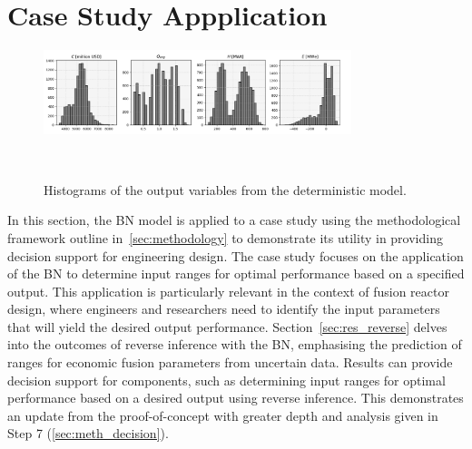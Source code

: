\documentclass[journal]{IEEEtran}
\begin{document}
\section{Case Study Appplication}\label{sec:res_decision} 

\begin{figure}[t]
    \centering
    \includegraphics[width=0.8\textwidth]{figures/TE_results/outputs_marchdata.png}
    \caption{\small Histograms of the output variables from the deterministic model.}~\label{fig:outputs_marchdata}
\end{figure}

In this section, the BN model is applied to a case study using the methodological framework outline in~\ref{sec:methodology} to demonstrate its utility in providing decision support for engineering design. The case study focuses on the application of the BN to determine input ranges for optimal performance based on a specified output. This application is particularly relevant in the context of fusion reactor design, where engineers and researchers need to identify the input parameters that will yield the desired output performance. Section~\ref{sec:res_reverse} delves into the outcomes of reverse inference with the BN, emphasising the prediction of ranges for economic fusion parameters from uncertain data. Results can provide decision support for components, such as determining input ranges for optimal performance based on a desired output using reverse inference. This demonstrates an update from the proof-of-concept with greater depth and analysis given in Step 7 (\ref{sec:meth_decision}).
\end{document}
